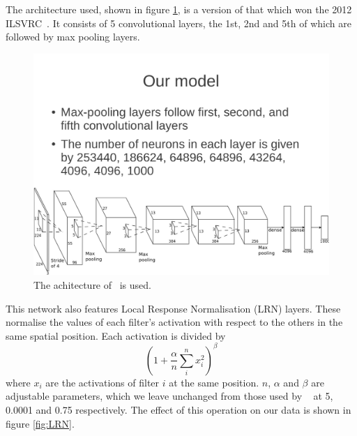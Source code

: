 \documentclass[11pt]{article} %
\begin{document}
\label{sec:alexNet}

The architecture used, shown in figure \ref{fig:alexNet}, is a version of that which won the 2012 ILSVRC~\cite{Krizhevsky2012}. It consists of 5 convolutional layers, the 1st, 2nd and 5th of which are followed by max pooling layers. 

\begin{figure}
\centering
\includegraphics*[width=\linewidth,trim={0cm 0cm 0.78cm 12cm},clip]{alexNet} 
\caption{ The achitecture of~\cite{Krizhevsky2012} is used.\label{fig:alexNet}}
\end{figure}



This network also features Local Response Normalisation (LRN) layers. These normalise the values of each filter's activation with respect to the others in the same spatial position. Each activation is divided by
\begin{equation}
(1 + \frac{\alpha}{n} \sum_i^n x_i^2)^\beta
\end{equation}
where $x_i$ are the activations of filter $i$ at the same position. $n$, $\alpha$ and $\beta$ are adjustable parameters, which we leave unchanged from those used by ~\cite{Krizhevsky2012} at 5, 0.0001 and 0.75 respectively. The effect of this operation on our data is shown in figure \ref{fig:LRN}. 
\end{document}
